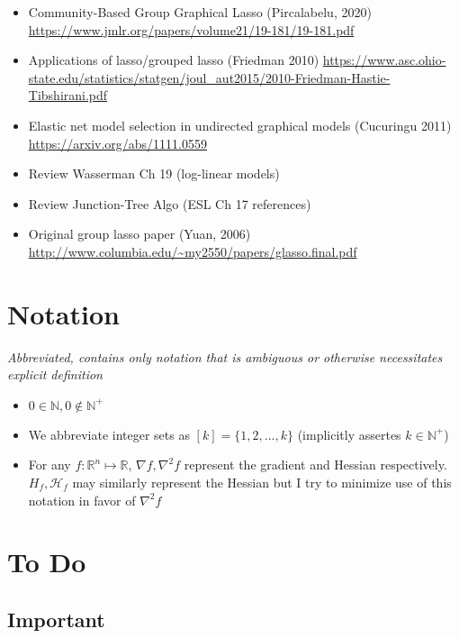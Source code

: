 \documentclass[11pt]{article}
\begin{document}
\begin{itemize}
    \item Community-Based Group Graphical Lasso (Pircalabelu, 2020) \url{https://www.jmlr.org/papers/volume21/19-181/19-181.pdf}
    \item Applications of lasso/grouped lasso (Friedman 2010) \url{https://www.asc.ohio-state.edu/statistics/statgen/joul_aut2015/2010-Friedman-Hastie-Tibshirani.pdf}
    \item Elastic net model selection in undirected graphical models (Cucuringu 2011) \url{https://arxiv.org/abs/1111.0559}
    \item Review Wasserman Ch 19 (log-linear models)
    \item Review Junction-Tree Algo (ESL Ch 17 references) 
    \item Original group lasso paper (Yuan, 2006) \url{http://www.columbia.edu/~my2550/papers/glasso.final.pdf}
\end{itemize}


\newpage 

\section*{Notation}

{\it Abbreviated, contains only notation that is ambiguous or otherwise necessitates explicit definition}
 
\begin{itemize}
    \item $0 \in \mathbb{N}, 0 \not\in \mathbb{N}^+$
    \item We abbreviate integer sets as $[k] = \{1, 2, ..., k\}$ (implicitly assertes $k \in \mathbb{N}^+$)
    \item For any $f: \mathbb{R}^n \mapsto \mathbb{R}$, $\nabla f, \nabla^2 f$ represent the gradient and Hessian respectively. $H_f, \mathcal{H}_f$ may similarly represent the Hessian but I try to minimize use of this notation in favor of $\nabla^2f$
\end{itemize}

\newpage  
\section*{To Do}

\subsection*{Important}
\end{document}
